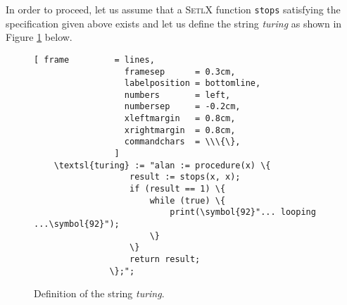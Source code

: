 In order to proceed, let us assume that a \textsc{SetlX} function \texttt{stops}
satisfying the specification given above exists and let us define the string
\textsl{turing} as shown in Figure \ref{fig:turing-string} below.

\begin{figure}[!h]
  \centering
\begin{Verbatim}[ frame         = lines, 
                  framesep      = 0.3cm, 
                  labelposition = bottomline,
                  numbers       = left,
                  numbersep     = -0.2cm,
                  xleftmargin   = 0.8cm,
                  xrightmargin  = 0.8cm,
                  commandchars  = \\\{\},
                ]
    \textsl{turing} := "alan := procedure(x) \{
                   result := stops(x, x);
                   if (result == 1) \{
                       while (true) \{
                           print(\symbol{92}"... looping ...\symbol{92}");
                       \}
                   \}
                   return result;
               \};";
\end{Verbatim}
  \vspace*{-0.3cm}
  \caption{Definition of the string \textsl{turing}.}
  \label{fig:turing-string}
\end{figure}

